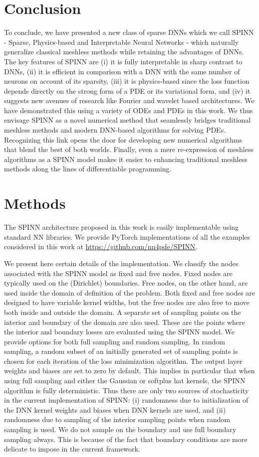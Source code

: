 \documentclass[12pt]{article}
\begin{document}
\section*{Conclusion}
To conclude, we have presented a new class of sparse DNNs which we call SPINN - Sparse, Physics-based and Interpretable Neural Networks - which naturally generalize classical meshless methods while retaining the advantages of DNNs. The key features  of SPINN are (i) it is fully interpretable in sharp contrast to DNNs, (ii) it is efficient in comparison with a DNN with the same number of neurons on account of its sparsity, (iii) it is physics-based since the loss function depends directly on the strong form of a PDE or its variational form, and (iv) it suggests new avenues of research like Fourier and wavelet based architectures. We have demonstrated this using a variety of ODEs and PDEs in this work.  We thus envisage SPINN as a novel numerical method that seamlessly bridges traditional meshless methods and modern DNN-based algorithms for solving PDEs.  Recognizing this link opens the door for developing new numerical algorithms that blend the best of both worlds. Finally, even a mere re-expression of meshless algorithms as a SPINN model makes it easier to enhancing traditional meshless methods along the lines of differentiable programming.

\section*{Methods}
The SPINN architecture proposed in this work is easily implementable using standard NN libraries. We provide PyTorch implementations of all the examples considered in this work at \url{https://github.com/nn4pde/SPINN}.

We present here certain details of the implementation. We classify the nodes associated with the SPINN model as fixed and free nodes. Fixed nodes are typically used on the (Dirichlet) boundaries. Free nodes, on the other hand, are used inside the domain of definition of the problem. Both fixed and free nodes are designed to have variable kernel widths, but the free nodes are also free to move both inside and outside the domain. A separate set of sampling points on the interior and boundary of the domain are also used. These are the points where the interior and boundary losses are evaluated using the SPINN model. We provide options for both full sampling and random sampling. In random sampling, a random subset of an initially generated set of sampling points is chosen for each iteration of the loss minimization algorithm. The output layer weights and biases are set to zero by default. This implies in particular that when using full sampling and either the Gaussian or softplus hat kernels, the SPINN algorithm is fully deterministic. Thus there are only two sources of stochasticity in the current implementation of SPINN: (i) randomness due to initialization of the DNN kernel weights and biases when DNN kernels are used, and (ii) randomness due to sampling of the interior sampling points when random sampling is used. We do not sample on the boundary and use full boundary sampling always. This is because of the fact that boundary conditions are more delicate to impose in the current framework.
\end{document}
